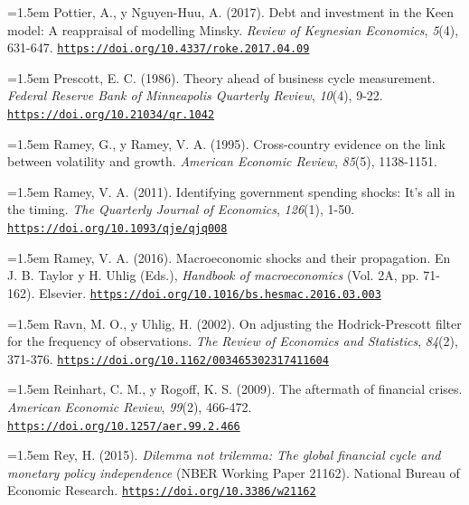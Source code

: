 \documentclass[10pt,a4paper]{article}
\begin{document}
{\sloppy\noindent\hangindent=1.5em Pottier, A., y Nguyen-Huu, A. (2017). Debt and investment in the Keen model: A reappraisal of modelling Minsky. \textit{Review of Keynesian Economics}, \textit{5}(4), 631-647. \href{https://doi.org/10.4337/roke.2017.04.09}{\nolinkurl{https://doi.org/10.4337/roke.2017.04.09}}\par}

\noindent\hangindent=1.5em Prescott, E. C. (1986). Theory ahead of business cycle measurement. \textit{Federal Reserve Bank of Minneapolis Quarterly Review}, \textit{10}(4), 9-22. \href{https://doi.org/10.21034/qr.1042}{\nolinkurl{https://doi.org/10.21034/qr.1042}}

\noindent\hangindent=1.5em Ramey, G., y Ramey, V. A. (1995). Cross-country evidence on the link between volatility and growth. \textit{American Economic Review}, \textit{85}(5), 1138-1151.

\noindent\hangindent=1.5em Ramey, V. A. (2011). Identifying government spending shocks: It's all in the timing. \textit{The Quarterly Journal of Economics}, \textit{126}(1), 1-50. \href{https://doi.org/10.1093/qje/qjq008}{\nolinkurl{https://doi.org/10.1093/qje/qjq008}}

\noindent\hangindent=1.5em Ramey, V. A. (2016). Macroeconomic shocks and their propagation. En J. B. Taylor y H. Uhlig (Eds.), \textit{Handbook of macroeconomics} (Vol. 2A, pp. 71-162). Elsevier. \href{https://doi.org/10.1016/bs.hesmac.2016.03.003}{\nolinkurl{https://doi.org/10.1016/bs.hesmac.2016.03.003}}

\noindent\hangindent=1.5em Ravn, M. O., y Uhlig, H. (2002). On adjusting the Hodrick-Prescott filter for the frequency of observations. \textit{The Review of Economics and Statistics}, \textit{84}(2), 371-376. \href{https://doi.org/10.1162/003465302317411604}{\nolinkurl{https://doi.org/10.1162/003465302317411604}}

\noindent\hangindent=1.5em Reinhart, C. M., y Rogoff, K. S. (2009). The aftermath of financial crises. \textit{American Economic Review}, \textit{99}(2), 466-472. \href{https://doi.org/10.1257/aer.99.2.466}{\nolinkurl{https://doi.org/10.1257/aer.99.2.466}}

\noindent\hangindent=1.5em Rey, H. (2015). \textit{Dilemma not trilemma: The global financial cycle and monetary policy independence} (NBER Working Paper 21162). National Bureau of Economic Research. \href{https://doi.org/10.3386/w21162}{\nolinkurl{https://doi.org/10.3386/w21162}}
\end{document}

